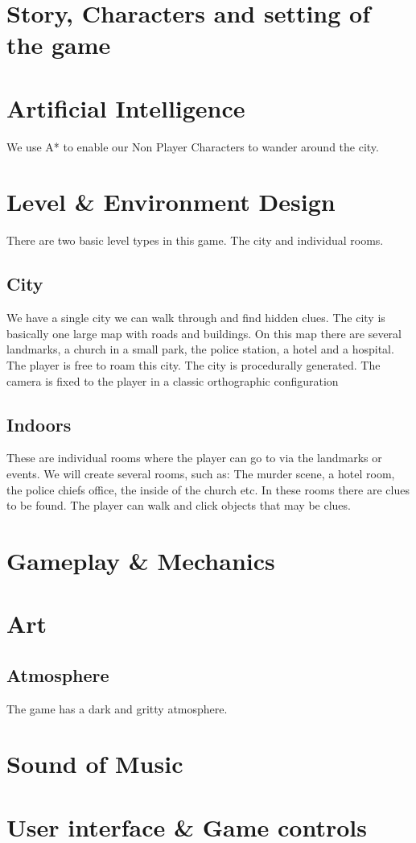 \documentclass{article}
\begin{document}
\section{Story, Characters and setting of the game}

\section{Artificial Intelligence}
	We use A* to enable our Non Player Characters to wander around the city. 

\section{Level \& Environment Design}
	There are two basic level types in this game. The city and individual rooms.
	\subsection{City}
		We have a single city we can walk through and find hidden clues. The city is basically one large map with roads and buildings. On this map there are several landmarks, a church in a small park, the police station, a hotel and a hospital. The player is free to roam this city. The city is procedurally generated. The camera is fixed to the player in a classic orthographic configuration
	\subsection{Indoors}
		These are individual rooms where the player can go to via the landmarks or events. We will create several rooms, such as: The murder scene, a hotel room, the police chiefs office, the inside of the church etc. In these rooms there are clues to be found. The player can walk and click objects that may be clues.

\section{Gameplay \& Mechanics}

\section{Art}
	\subsection{Atmosphere}
		The game has a dark and gritty atmosphere.

\section{Sound of Music}

\section{User interface \& Game controls}
\end{document}
